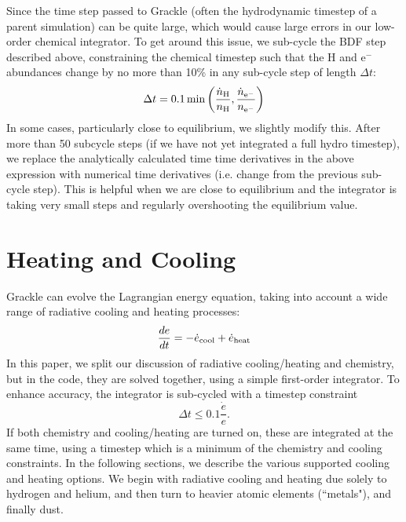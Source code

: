 Since the time step passed to Grackle (often the hydrodynamic timestep of a parent simulation) can be quite large, which would cause large errors in our low-order chemical integrator.  To get around this issue, we sub-cycle the BDF step described above, constraining the chemical timestep such that the H and e$^-$ abundances change by no more than 10\% in any sub-cycle step of length $\Delta t$:
\begin{equation}
\Delta t = 0.1 \min \left( \frac{\dot{n}_{\rm H}}{n_{\rm H}} , \frac{\dot{n}_{\rm e^-}}{n_{\rm e^-}} \right)
\end{equation}
In some cases, particularly close to equilibrium, we slightly modify this.  After more than 50 subcycle steps (if we have not yet integrated a full hydro timestep), we replace the analytically calculated time time derivatives in the above expression with numerical time derivatives (i.e. change from the previous sub-cycle step).  This is helpful when we are close to equilibrium and the integrator is taking very small steps and regularly overshooting the equilibrium value.  


\section{Heating and Cooling} \label{Cooling}

Grackle can evolve the Lagrangian energy equation, taking into account a wide range of radiative cooling and heating processes:
\begin{equation}
\frac{de}{dt} = - \dot{e}_{\rm cool} + \dot{e}_{\rm heat}
\end{equation}
In this paper, we split our discussion of radiative cooling/heating and chemistry, but in the code, they are solved together, using a simple first-order integrator.  To enhance accuracy, the integrator is sub-cycled with a timestep constraint 
\begin{equation}
\Delta t \leq 0.1 \frac{\dot{e}}{e}.
\end{equation}
If both chemistry and cooling/heating are turned on, these are integrated at the same time, using a timestep which is a minimum of the chemistry and cooling constraints.  In the following sections, we describe the various supported cooling and heating options.  We begin with radiative cooling and heating due solely to hydrogen and helium, and then turn to heavier atomic elements (``metals"), and finally dust. 

